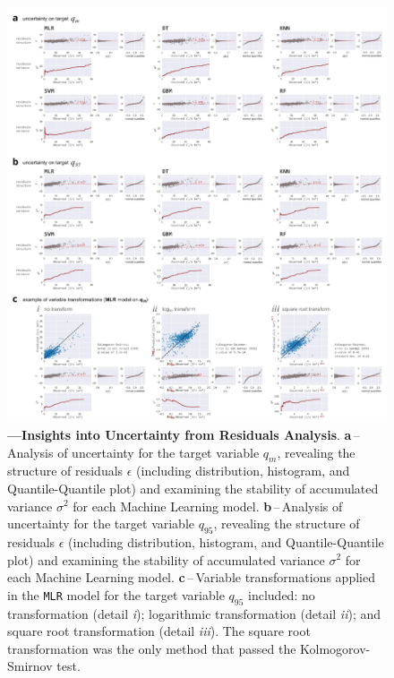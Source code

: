 \documentclass[12pt]{article}
\begin{document}
\FloatBarrier
\begin{figure}[t] %
	\centering                                       
	\includegraphics[width=0.98\linewidth]{figs/uncertainty.jpg}    
	\caption[Insights into Uncertainty]
	{\textbf{---\;Insights into Uncertainty from Residuals Analysis}.
        \textbf{a}\,--\,Analysis of uncertainty for the target variable $q_m$, revealing the structure of residuals $\epsilon$ (including distribution, histogram, and Quantile-Quantile plot) and examining the stability of accumulated variance $\sigma^2$ for each Machine Learning model.
        \textbf{b}\,--\,Analysis of uncertainty for the target variable $q_{95}$, revealing the structure of residuals $\epsilon$ (including distribution, histogram, and Quantile-Quantile plot) and examining the stability of accumulated variance $\sigma^2$ for each Machine Learning model.
        \textbf{c}\,--\,Variable transformations applied in the \texttt{MLR} model for the target variable $q_{95}$ included: no transformation (detail \textrm{\textit{i}}); logarithmic transformation (detail \textrm{\textit{ii}}); and square root transformation (detail \textrm{\textit{iii}}). The square root transformation was the only method that passed the Kolmogorov-Smirnov test.
        }
	\label{fig:uncert}  %
\end{figure}
\end{document}

